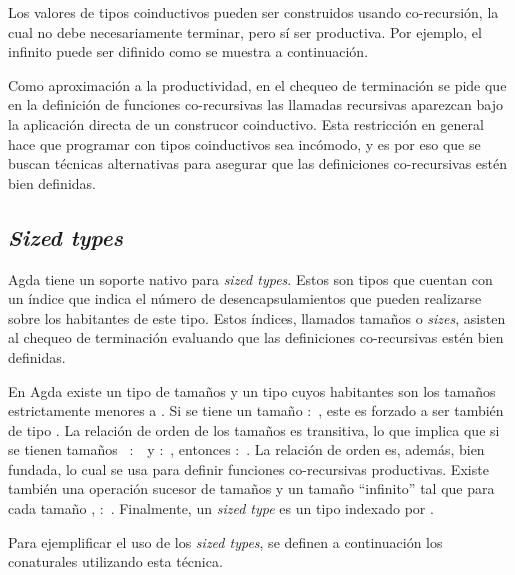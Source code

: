 Los valores de tipos coinductivos pueden ser construidos usando co-recursión, la cual no debe necesariamente terminar, pero sí ser productiva. Por ejemplo, el infinito puede ser difinido como se muestra a continuación.


Como aproximación a la productividad, en el chequeo de terminación se pide que en la definición de funciones co-recursivas las llamadas recursivas aparezcan bajo la aplicación directa de un construcor coinductivo. Esta restricción en general hace que programar con tipos coinductivos sea incómodo, y es por eso que se buscan técnicas alternativas para asegurar que las definiciones co-recursivas estén bien definidas. 

\subsection{\textit{Sized types}}\label{coind:agda:sized}

Agda tiene un soporte nativo para \textit{sized types}. Estos son tipos que cuentan con un índice que indica el número de desencapsulamientos que pueden realizarse sobre los habitantes de este tipo. Estos índices, llamados tamaños o \textit{sizes}, asisten al chequeo de terminación evaluando que las definiciones co-recursivas estén bien definidas. 

En Agda existe un tipo  de tamaños y un tipo   cuyos habitantes son los tamaños estrictamente menores a . Si se tiene un tamaño  $:$  , este es forzado a ser también de tipo . La relación de orden de los tamaños es transitiva, lo que implica que si se tienen tamaños \hbox{ $:$  } y  $:$  , entonces  $:$  . La relación de orden es, además, bien fundada, lo cual se usa para definir funciones co-recursivas productivas. Existe también una operación sucesor de tamaños \AgdaFunction{$\uparrow$} y un tamaño ``infinito'' \AgdaDatatype{$\infty$} tal que para cada tamaño ,  $:$  \AgdaDatatype{$\infty$}. Finalmente, un \textit{sized type} es un tipo indexado por .

Para ejemplificar el uso de los \textit{sized types}, se definen a continuación los conaturales utilizando esta técnica.

